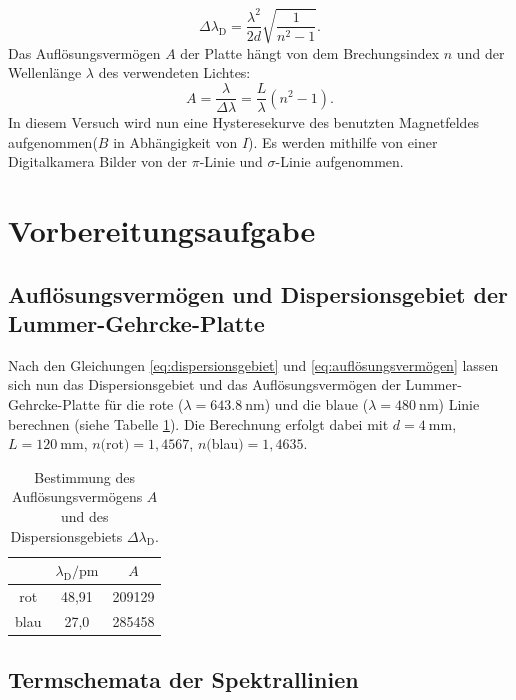 \documentclass{article}
\begin{document}
	\begin{equation}
	\label{eq:dispersionsgebiet}
	\Delta \lambda_\text{D} = \frac{\lambda^2}{2d} \sqrt{\frac{1}{n^2-1}}.
	\end{equation}
	Das Auflösungsvermögen $A$ der Platte hängt von dem Brechungsindex $n$ und  der Wellenlänge $\lambda$ des verwendeten Lichtes:
	\begin{equation}
	\label{eq:auflösungsvermögen}
	A = \frac{\lambda}{\Delta\lambda} = \frac{L}{\lambda}(n^2-1).
	\end{equation}
	In diesem Versuch wird nun eine Hysteresekurve des benutzten Magnetfeldes aufgenommen($B$ in Abhängigkeit von $I$). Es werden mithilfe von einer Digitalkamera Bilder von der $\pi$-Linie und $\sigma$-Linie aufgenommen.
	
	\section{Vorbereitungsaufgabe}
	
	\subsection{Auflösungsvermögen und Dispersionsgebiet der Lummer-Gehrcke-Platte}
	Nach den Gleichungen \ref{eq:dispersionsgebiet} und \ref{eq:auflösungsvermögen} lassen sich nun das Dispersionsgebiet und das Auflösungsvermögen der Lummer-Gehrcke-Platte für die rote ($\lambda=\SI{643,8}{\nano\meter}$) und die blaue ($\lambda=\SI{480}{\nano\meter}$) Linie berechnen (siehe Tabelle \ref{tab:auflösungsunddispersion}). Die Berechnung erfolgt dabei mit $d=\SI{4}{\milli\meter}$, $L=\SI{120}{\milli\meter}$, $n($rot$)=1,4567$, $n($blau$)=1,4635$.
	
	\begin{table}[htpb]
		\centering
		\caption{Bestimmung des Auflösungsvermögens $A$ und des Dispersionsgebiets $\Delta\lambda_\text{D}$.}
		\label{tab:auflösungsunddispersion}
		
		\begin{tabular}{c| c| c}
			
			& $\lambda_\text{D} / \si{\pico\meter}$ & $A$ \\
			\hline
			rot & 48,91 & 209129 \\
			blau & 27,0 & 285458 \\ 
		\end{tabular}
	\end{table}
	
	\subsection{Termschemata der Spektrallinien}
	
\end{document}

